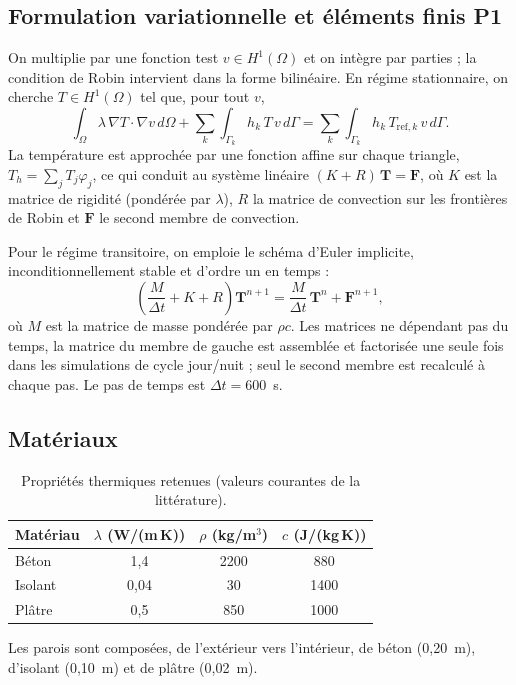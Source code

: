 \subsection{Formulation variationnelle et éléments finis P1}
On multiplie par une fonction test $v\in H^1(\Omega)$ et on intègre par parties ; la condition de Robin
intervient dans la forme bilinéaire. En régime stationnaire, on cherche $T\in H^1(\Omega)$ tel que, pour tout $v$,
\begin{equation}\label{eq:variationnelle}
\int_\Omega \lambda\,\nabla T\cdot\nabla v\,d\Omega+\sum_k\int_{\Gamma_k} h_k\,T\,v\,d\Gamma
=\sum_k\int_{\Gamma_k} h_k\,T_{\mathrm{ref},k}\,v\,d\Gamma .
\end{equation}
La température est approchée par une fonction affine sur chaque triangle, $T_h=\sum_j T_j\varphi_j$, ce qui
conduit au système linéaire $(K+R)\,\mathbf{T}=\mathbf{F}$, où $K$ est la matrice de rigidité (pondérée par
$\lambda$), $R$ la matrice de convection sur les frontières de Robin et $\mathbf{F}$ le second membre de convection.

Pour le régime transitoire, on emploie le schéma d'Euler implicite, inconditionnellement stable et d'ordre un
en temps :
\begin{equation}\label{eq:euler}
\left(\frac{M}{\Delta t}+K+R\right)\mathbf{T}^{n+1}=\frac{M}{\Delta t}\,\mathbf{T}^{n}+\mathbf{F}^{n+1},
\end{equation}
où $M$ est la matrice de masse pondérée par $\rho c$. Les matrices ne dépendant pas du temps, la matrice du
membre de gauche est assemblée et factorisée une seule fois dans les simulations de cycle jour/nuit ; seul
le second membre est recalculé à chaque pas. Le pas de temps est $\Delta t=600$~s.

\subsection{Matériaux}
\begin{table}[h]
\centering
\begin{tabular}{lccc}
\toprule
Matériau & $\lambda$ (W/(m\,K)) & $\rho$ (kg/m$^3$) & $c$ (J/(kg\,K)) \\
\midrule
Béton   & 1,4  & 2200 & 880  \\
Isolant & 0,04 & 30   & 1400 \\
Plâtre  & 0,5  & 850  & 1000 \\
\bottomrule
\end{tabular}
\caption{Propriétés thermiques retenues (valeurs courantes de la littérature).}
\label{tab:materiaux}
\end{table}
Les parois sont composées, de l'extérieur vers l'intérieur, de béton (0,20~m), d'isolant (0,10~m) et de
plâtre (0,02~m).


